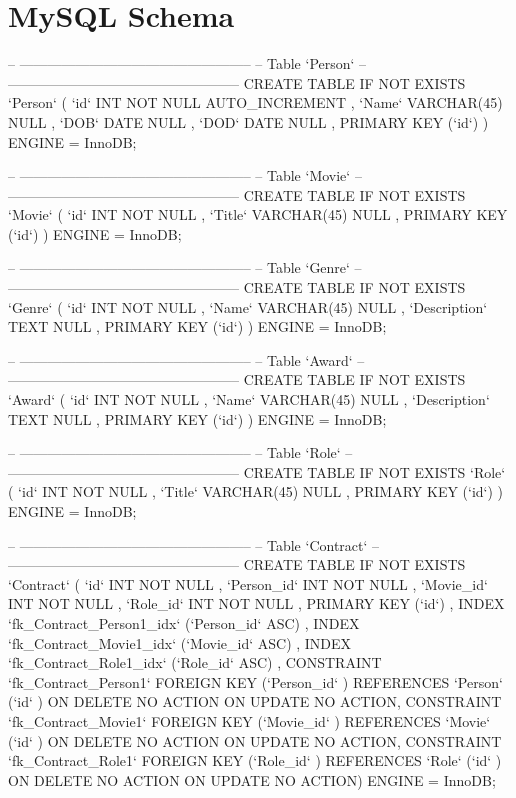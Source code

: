 \section{MySQL Schema}
\begin{spverbatim}
-- --------------------------------------------------
-- Table `Person`
-- --------------------------------------------------
CREATE  TABLE IF NOT EXISTS `Person` (
  `id` INT NOT NULL AUTO_INCREMENT ,
  `Name` VARCHAR(45) NULL ,
  `DOB` DATE NULL ,
  `DOD` DATE NULL ,
  PRIMARY KEY (`id`) )
ENGINE = InnoDB;


-- --------------------------------------------------
-- Table `Movie`
-- --------------------------------------------------
CREATE  TABLE IF NOT EXISTS `Movie` (
  `id` INT NOT NULL ,
  `Title` VARCHAR(45) NULL ,
  PRIMARY KEY (`id`) )
ENGINE = InnoDB;


-- --------------------------------------------------
-- Table `Genre`
-- --------------------------------------------------
CREATE  TABLE IF NOT EXISTS `Genre` (
  `id` INT NOT NULL ,
  `Name` VARCHAR(45) NULL ,
  `Description` TEXT NULL ,
  PRIMARY KEY (`id`) )
ENGINE = InnoDB;


-- --------------------------------------------------
-- Table `Award`
-- --------------------------------------------------
CREATE  TABLE IF NOT EXISTS `Award` (
  `id` INT NOT NULL ,
  `Name` VARCHAR(45) NULL ,
  `Description` TEXT NULL ,
  PRIMARY KEY (`id`) )
ENGINE = InnoDB;


-- --------------------------------------------------
-- Table `Role`
-- --------------------------------------------------
CREATE  TABLE IF NOT EXISTS `Role` (
  `id` INT NOT NULL ,
  `Title` VARCHAR(45) NULL ,
  PRIMARY KEY (`id`) )
ENGINE = InnoDB;


-- --------------------------------------------------
-- Table `Contract`
-- --------------------------------------------------
CREATE  TABLE IF NOT EXISTS `Contract` (
  `id` INT NOT NULL ,
  `Person_id` INT NOT NULL ,
  `Movie_id` INT NOT NULL ,
  `Role_id` INT NOT NULL ,
  PRIMARY KEY (`id`) ,
  INDEX `fk_Contract_Person1_idx` (`Person_id` ASC) ,
  INDEX `fk_Contract_Movie1_idx` (`Movie_id` ASC) ,
  INDEX `fk_Contract_Role1_idx` (`Role_id` ASC) ,
  CONSTRAINT `fk_Contract_Person1`
    FOREIGN KEY (`Person_id` )
    REFERENCES `Person` (`id` )
    ON DELETE NO ACTION
    ON UPDATE NO ACTION,
  CONSTRAINT `fk_Contract_Movie1`
    FOREIGN KEY (`Movie_id` )
    REFERENCES `Movie` (`id` )
    ON DELETE NO ACTION
    ON UPDATE NO ACTION,
  CONSTRAINT `fk_Contract_Role1`
    FOREIGN KEY (`Role_id` )
    REFERENCES `Role` (`id` )
    ON DELETE NO ACTION
    ON UPDATE NO ACTION)
ENGINE = InnoDB;



\end{spverbatim}
